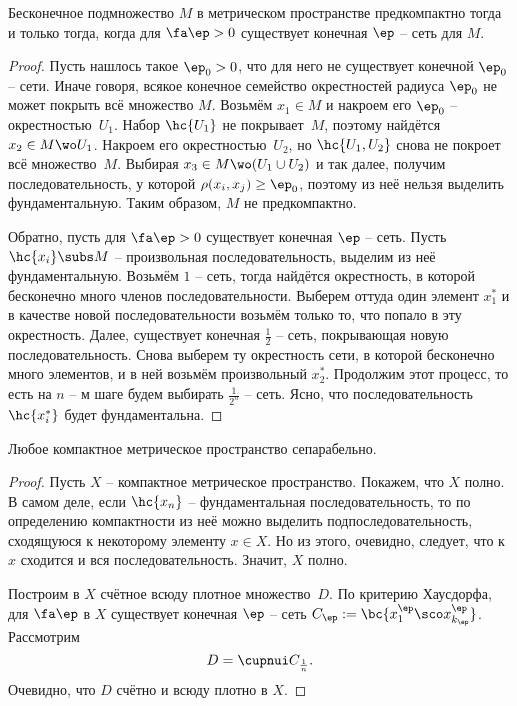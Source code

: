 \documentclass[a4paper]{article}
\begin{document}
\begin{theorem}
Бесконечное подмножество $M$ в метрическом пространстве предкомпактно тогда и только тогда,
когда для $\fa \ep > 0$ существует конечная $\ep$ -- сеть для $M$.
\end{theorem}
\begin{proof}
Пусть нашлось такое $\ep_0 > 0$, что для него не существует конечной $\ep_0$ -- сети.
Иначе говоря, всякое конечное семейство окрестностей радиуса $\ep_0$ не может покрыть
всё множество $M$. Возьмём $x_1 \in M$ и накроем его $\ep_0$ -- окрестностью~$U_1$. Набор
$\hc{U_1}$ не покрывает~$M$, поэтому найдётся $x_2 \in M \wo U_1$.
Накроем его окрестностью~$U_2$, но $\hc{U_1,U_2}$ снова не покроет всё множество~$M$.
Выбирая $x_3 \in M \wo (U_1 \cup U_2)$ и так далее, получим последовательность, у которой
$\rho(x_i, x_j) \ge \ep_0$, поэтому из неё нельзя выделить фундаментальную.
Таким образом, $M$ не предкомпактно.

Обратно, пусть для $\fa \ep > 0$ существует конечная $\ep$ -- сеть. Пусть $\hc{x_i} \subs M$ -- произвольная
последовательность, выделим из неё фундаментальную.
Возьмём $1$ -- сеть, тогда найдётся окрестность, в которой бесконечно много членов последовательности.
Выберем оттуда один элемент $x_1^*$ и в качестве новой последовательности возьмём только то, что
попало в эту окрестность. Далее, существует конечная $\frac12$ -- сеть, покрывающая новую
последовательность. Снова выберем ту окрестность сети, в которой бесконечно много элементов,
и в ней возьмём произвольный $x_2^*$.
Продолжим этот процесс, то есть на $n$ -- м шаге будем выбирать $\frac1{2^n}$ -- сеть.
Ясно, что последовательность $\hc{x_i^*}$ будет фундаментальна.
\end{proof}

\begin{imp}
Любое компактное метрическое пространство сепарабельно.
\end{imp}
\begin{proof}
Пусть $X$ -- компактное метрическое пространство.
Покажем, что $X$ полно. В самом деле, если $\hc{x_n}$ -- фундаментальная последовательность,
то по определению компактности из неё можно выделить подпоследовательность, сходящуюся к
некоторому элементу $x \in X$. Но из этого, очевидно, следует, что к~$x$ сходится
и вся последовательность. Значит, $X$ полно.

Построим в $X$ счётное всюду плотное множество~$D$.
По критерию Хаусдорфа, для $\fa \ep$ в $X$ существует конечная $\ep$ -- сеть
$C_\ep := \bc{x^\ep_1\sco x^\ep_{k_\ep}}$.
Рассмотрим
$$D = \cupnui C_{\frac1n}.$$
Очевидно, что $D$ счётно и всюду плотно в $X$.
\end{proof}
\end{document}
